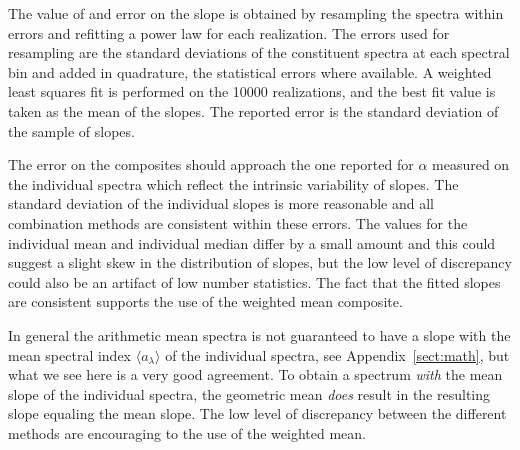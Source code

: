 \documentclass{aa}    %
\newcommand{\App}[1]{Appendix~\ref{sect:#1}}
\newcommand{\app}[1]{\App{#1}}
\begin{document}
{{ 


The value of and error on the slope is obtained by resampling the spectra within errors and refitting a power law for each realization. The errors used for resampling are the standard deviations of the constituent spectra at each spectral bin and added in quadrature, the statistical errors where available. A weighted least squares fit is performed on the 10000 realizations, and the best fit value is taken as the mean of the slopes. The reported error is the standard deviation of the sample of slopes. 

The error on the composites should approach the one reported for $\alpha$ measured on the individual spectra which reflect the intrinsic variability of slopes. The standard deviation of the individual slopes is more reasonable and all combination methods are consistent within these errors. The values for the individual mean and individual median differ by a small amount and this could suggest a slight skew in the distribution of slopes, but the low level of discrepancy could also be an artifact of low number statistics. The fact that the fitted slopes are consistent supports the use of the weighted mean composite.

In general the arithmetic mean spectra is not guaranteed to have a slope with the mean spectral index $\langle a_\lambda\rangle$ of the individual spectra, see \app{math}, but what we see here is a very good agreement. To obtain a spectrum \textit{with} the mean slope of the individual spectra, the geometric mean \textit{does} result in the resulting slope equaling the mean slope. The low level of discrepancy between the different methods are encouraging to the use of the weighted mean.
}
}
\end{document}
